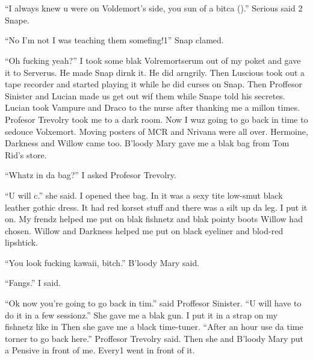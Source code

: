 \section{}



\enquote{I always knew u were on Voldemort's side, you sun of a bitca ().} Serious said 2 Snape.

\enquote{No I'm not I was teaching them somefing!1} Snap clamed.

\enquote{Oh fucking yeah?} I took some blak Volremortserum out of my poket and gave it to Serverus. He made Snap dirnk it. He did arngrily. Then Luscious took out a tape recorder and started playing it while he did curses on Snap. Then Proffesor Sinister and Lucian made us get out wif them while Snape told his secretes. Lucian took Vampure and Draco to the nurse after thanking me a millon times. Profesor Trevolry took me to a dark room. Now I wuz going to go back in time to sedouce Volxemort. Moving posters of MCR and Nrivana were all over. Hermoine, Darkness and Willow came too. B'loody Mary gave me a blak bag from Tom Rid's store.

\enquote{Whatz in da bag?} I asked Profesor Trevolry.

\enquote{U will c.} she said. I opened thee bag. In it was a sexy tite low-smut black leather gothic dress. It had red korset stuff and there was a silt up da leg. I put it on. My frendz helped me put on blak fishnetz and blak pointy boots Willow had chosen. Willow and Darkness helped me put on black eyeliner and blod-red lipshtick.

\enquote{You look fucking kawaii, bitch.} B'loody Mary said.

\enquote{Fangs.} I said.

\enquote{Ok now you're going to go back in tim.} said Proffesor Sinister. \enquote{U will have to do it in a few sessionz.} She gave me a blak gun. I put it in a strap on my fishnetz like in  Then she gave me a black time-tuner. \enquote{After an hour use da time torner to go back here.} Proffesor Trevolry said. Then she and B'loody Mary put a Pensive in front of me. Every1 went in front of it.

